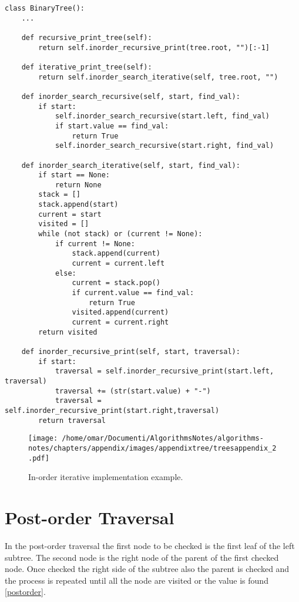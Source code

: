 \begin{lstlisting}[firstnumber=1, caption={Recursive and iterative implementation of in-order traversal.}]
class BinaryTree():
	...

	def recursive_print_tree(self):
		return self.inorder_recursive_print(tree.root, "")[:-1]
	
	def iterative_print_tree(self):
		return self.inorder_search_iterative(self, tree.root, "")

	def inorder_search_recursive(self, start, find_val):
		if start:
			self.inorder_search_recursive(start.left, find_val)
			if start.value == find_val:
				return True
			self.inorder_search_recursive(start.right, find_val)

	def inorder_search_iterative(self, start, find_val):
		if start == None:
			return None
		stack = []
		stack.append(start)
		current = start
		visited = []
		while (not stack) or (current != None):
			if current != None:
				stack.append(current)
				current = current.left
			else:
				current = stack.pop()
				if current.value == find_val:
					return True
				visited.append(current)
				current = current.right
		return visited		
		
	def inorder_recursive_print(self, start, traversal):
		if start:
			traversal = self.inorder_recursive_print(start.left, traversal)
			traversal += (str(start.value) + "-")
			traversal = self.inorder_recursive_print(start.right,traversal)
		return traversal
\end{lstlisting}

\begin{figure}[H]
	\begin{center}
		\texttt{[image: /home/omar/Documenti/AlgorithmsNotes/algorithms-notes/chapters/appendix/images/appendixtree/treesappendix\_2.pdf]}
		\caption[In-order iterative implementation example.]{In-order iterative implementation example.}
		\label{appendixtrees_2}
	\end{center}
\end{figure}

\section{Post-order Traversal}
\label{postorderappendix}
In the post-order traversal the first node to be checked is the first leaf of the left subtree. The second node is the right node of the parent of the first checked node. Once checked the right side of the subtree also the parent is checked and the process is repeated until all the node are visited or the value is found \ref{postorder}. 

